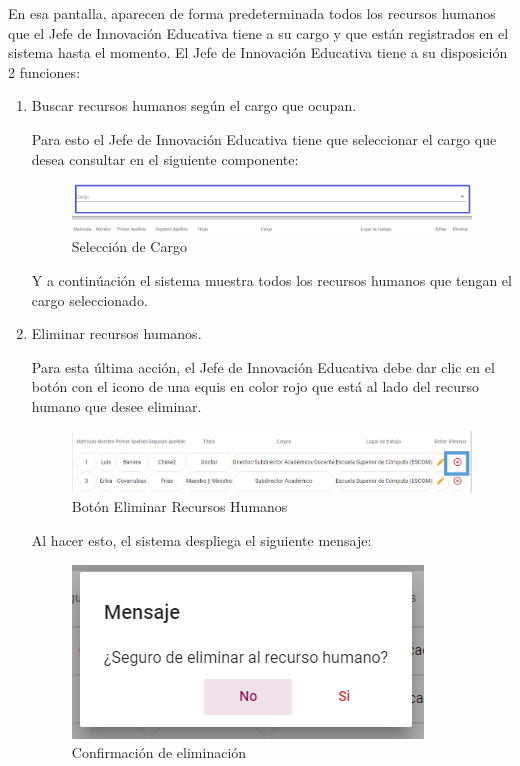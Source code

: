         En esa pantalla, aparecen de forma predeterminada todos los recursos humanos que el Jefe de Innovación Educativa tiene a su cargo y que están registrados en el sistema hasta el momento. El Jefe de Innovación Educativa tiene a su disposición 2 funciones:
        \newpage
        \begin{enumerate}

            \item   Buscar recursos humanos según el cargo que ocupan.

                Para esto el Jefe de Innovación Educativa tiene que seleccionar el cargo que desea consultar en el siguiente componente:

                \begin{figure}[H]
                    \centering
                    \hypertarget{cargo1}{\includegraphics[width=0.7\linewidth]{images/SP1/BtnCargo1}}
                    \caption{Selección de Cargo}
                    \label{cargo1}
                \end{figure}

                 Y a continúación el sistema muestra todos los recursos humanos que tengan el cargo seleccionado.

                    \item Eliminar recursos humanos.

                Para esta última acción, el Jefe de Innovación Educativa debe dar clic en el botón con el icono de una equis en color rojo que está al lado del recurso humano que desee  eliminar.

                \begin{figure}[H]
                    \centering
                    \hypertarget{eliminar}{\includegraphics[width=0.7\linewidth]{images/SP1/BtnEliminar}}
                    \caption{Botón Eliminar Recursos Humanos}
                    \label{eliminar}
                \end{figure}

                Al hacer esto, el sistema despliega el siguiente mensaje:

               \begin{figure}[H]
                    \centering
                    \includegraphics[width=0.4\linewidth]{images/SP1/MSG22}
                \caption{Confirmación de eliminación}
                \label{confirmarE}


\end{figure}
\end{enumerate}
